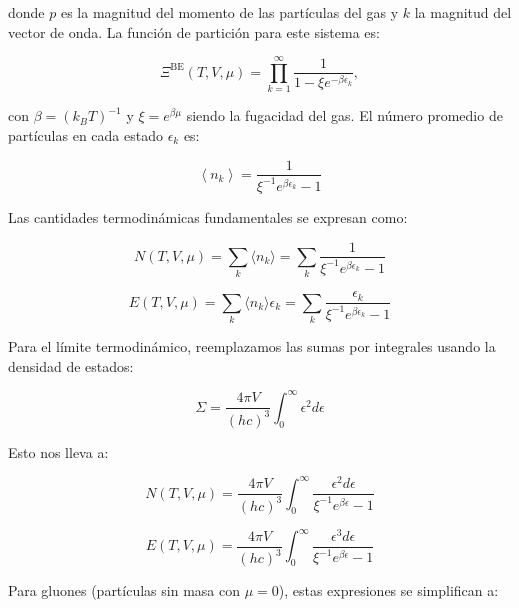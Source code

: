 donde $p$ es la magnitud del momento de las partículas del gas y $k$ la magnitud del vector de onda. La función de partición para este sistema es:

\begin{equation}\label{eq-partfunc}
{\Xi}^{\mathrm{BE}}\left(T,V,\mu\right) = \prod_{k=1}^{\infty}\frac{1}{1-\xi {e}^{-\beta {\epsilon}_{k}}},
\end{equation}

con $\beta = (k_B T)^{-1}$ y $\xi = e^{\beta\mu}$ siendo la fugacidad del gas. El número promedio de partículas en cada estado ${\epsilon}_k$ es:

\begin{equation}
    \left\langle {n}_{k} \right\rangle = \frac{1}{{\xi}^{-1}{e}^{\beta{\epsilon}_{k}}-1} 
\end{equation}

Las cantidades termodinámicas fundamentales se expresan como:

\begin{equation}\label{eq-BE-Ntotal}
N(T,V,\mu) = \sum_k \langle n_k \rangle = \sum_k \frac{1}{{\xi}^{-1}{e}^{\beta{\epsilon}_{k}}-1}
\end{equation}

\begin{equation}\label{eq-BE-Etotal}
E(T,V,\mu) = \sum_k \langle n_k \rangle \epsilon_k = \sum_k \frac{\epsilon_k}{{\xi}^{-1}{e}^{\beta{\epsilon}_{k}}-1}
\end{equation}

Para el límite termodinámico, reemplazamos las sumas por integrales usando la densidad de estados:

\begin{equation}\label{eq-totalestados}
\Sigma = \frac{4\pi V}{(hc)^3} \int_0^\infty \epsilon^2 d\epsilon
\end{equation}

Esto nos lleva a:

\begin{equation}\label{eq-BE-Ntotalint}
N(T,V,\mu) = \frac{4\pi V}{(hc)^3} \int_0^\infty \frac{\epsilon^2 d\epsilon}{{\xi}^{-1}e^{\beta\epsilon}-1}
\end{equation}

\begin{equation}\label{eq-BE-Etotalint}
E(T,V,\mu) = \frac{4\pi V}{(hc)^3} \int_0^\infty \frac{\epsilon^3 d\epsilon}{{\xi}^{-1}e^{\beta\epsilon}-1}
\end{equation}

Para gluones (partículas sin masa con $\mu=0$), estas expresiones se simplifican a:

